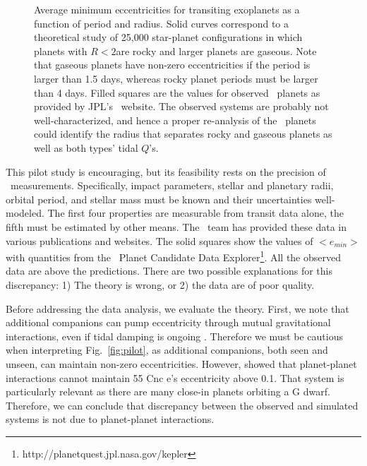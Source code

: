 \begin{figure}[h]
\centering
\begin{minipage}{2.7in}
\end{minipage}
\begin{minipage}{2.7in}
\caption{\label{fig:emin}Average minimum eccentricities for transiting
  exoplanets as a function of period and radius. Solid curves
  correspond to a theoretical study of 25,000 star-planet
  configurations in which planets with $R < 2$\rearth are rocky and
  larger planets are gaseous. Note that gaseous planets have non-zero
  eccentricities if the period is larger than 1.5 days, whereas rocky
  planet periods must be larger than 4 days. Filled squares are the
  values for observed \kepler~planets as provided by JPL's
  \kepler~website. The observed systems are probably not
  well-characterized, and hence a proper re-analysis of the
  \kepler~planets could identify the radius that separates rocky and
  gaseous planets as well as both types' tidal $Q$'s.}
\end{minipage}
\end{figure}

This pilot study is encouraging, but its feasibility rests on the
precision of \kepler~measurements. Specifically, impact parameters,
stellar and planetary radii, orbital period, and stellar mass must be
known and their uncertainties well-modeled. The first four properties
are measurable from transit data alone, the fifth must be estimated by
other means. The \kepler~team has provided these data in various
publications and websites. The solid squares show the values of
$<e_{min}>$ with quantities from the \kepler~Planet Candidate Data
Explorer\footnote{http://planetquest.jpl.nasa.gov/kepler}. All the
observed data are above the predictions. There are two possible
explanations for this discrepancy: 1) The theory is wrong, or 2) the
data are of poor quality.

\medskip
{\centerline{}}
\smallskip

Before addressing the data analysis, we evaluate the theory. First, we
note that additional companions can pump eccentricity through mutual
gravitational interactions, even if tidal damping is ongoing
\cite{vanLaerhovenGreenberg13,Bolmont13}. Therefore we must be
cautious when interpreting Fig.~\ref{fig:pilot}, as additional
companions, both seen and unseen, can maintain non-zero
eccentricities. However, \cite{Bolmont13} showed that planet-planet
interactions cannot maintain 55 Cnc e's eccentricity above 0.1. That
system is particularly relevant as there are many close-in planets
orbiting a G dwarf. Therefore, we can conclude that discrepancy
between the observed and simulated systems is not due to planet-planet
interactions.

